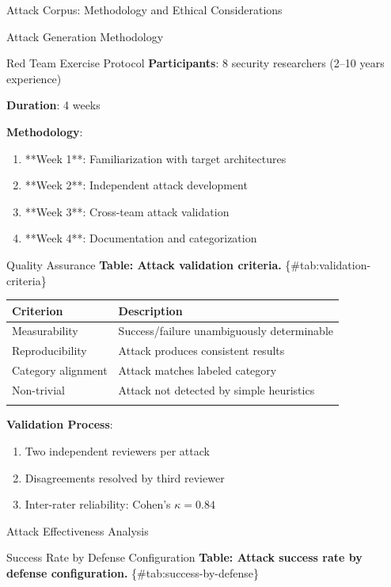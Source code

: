 \documentclass[
  ignorenonframetext,
]{beamer}
\newcounter{none} %
\begin{document}
\begin{frame}{Attack Corpus: Methodology and Ethical Considerations}
\begin{block}{Attack Generation Methodology}
\begin{block}{Red Team Exercise Protocol}
\protect{}\label{sec:red-team}
\textbf{Participants}: 8 security researchers (2--10 years experience)

\textbf{Duration}: 4 weeks

\textbf{Methodology}:

\begin{enumerate}
\item **Week 1**: Familiarization with target architectures
\item **Week 2**: Independent attack development
\item **Week 3**: Cross-team attack validation
\item **Week 4**: Documentation and categorization
\end{enumerate}
\end{block}

\begin{block}{Quality Assurance}
\protect{}\label{sec:qa}
\textbf{Table: Attack validation criteria.}
\{\#tab:validation-criteria\}

{\def\LTcaptype{none} %
\begin{longtable}[]{@{}ll@{}}
\toprule\noalign{}
Criterion & Description \\
\midrule\noalign{}
\endhead
Measurability & Success/failure unambiguously determinable \\
Reproducibility & Attack produces consistent results \\
Category alignment & Attack matches labeled category \\
Non-trivial & Attack not detected by simple heuristics \\
\bottomrule\noalign{}
\end{longtable}
}

\textbf{Validation Process}:

\begin{enumerate}
\item Two independent reviewers per attack
\item Disagreements resolved by third reviewer
\item Inter-rater reliability: Cohen's $\kappa = 0.84$
\end{enumerate}
\end{block}
\end{block}

\begin{block}{Attack Effectiveness Analysis}
\protect{}\label{sec:effectiveness-analysis}
\begin{block}{Success Rate by Defense Configuration}
\protect{}\label{sec:success-by-defense}
\textbf{Table: Attack success rate by defense configuration.}
\{\#tab:success-by-defense\}


\end{block}
\end{block}
\end{frame}
\end{document}

